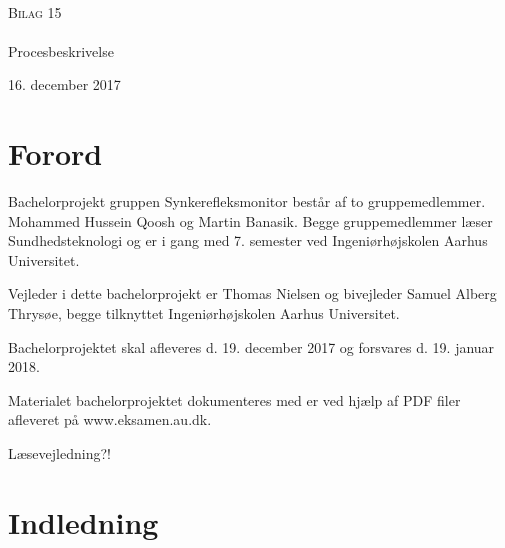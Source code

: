 


\begin{titlingpage}
\begin{center}

~ \\[3cm]


\textsc{\LARGE Bilag 15}\\[1.5cm]


\noindent\makebox[\linewidth]{\rule{\textwidth}{0.4pt}}\\
[0.5cm]{\Huge Procesbeskrivelse}
\noindent\makebox[\linewidth]{\rule{\textwidth}{0.4pt}}
\end{center}
\vfill
\begin{center}
{\large 16. december 2017}
\end{center}
\end{titlingpage}

\newpage
\tableofcontents

\chapter{Forord} 

Bachelorprojekt gruppen Synkerefleksmonitor består af to gruppemedlemmer. Mohammed Hussein Qoosh og Martin Banasik. Begge gruppemedlemmer læser Sundhedsteknologi og er i gang med 7. semester ved Ingeniørhøjskolen Aarhus Universitet.

Vejleder i dette bachelorprojekt er Thomas Nielsen og bivejleder Samuel Alberg Thrysøe, begge tilknyttet Ingeniørhøjskolen Aarhus Universitet.

Bachelorprojektet skal afleveres d. 19. december 2017 og forsvares d. 19. januar 2018.

Materialet bachelorprojektet dokumenteres med er ved hjælp af PDF filer afleveret på www.eksamen.au.dk.

Læsevejledning?!










\chapter{Indledning}


